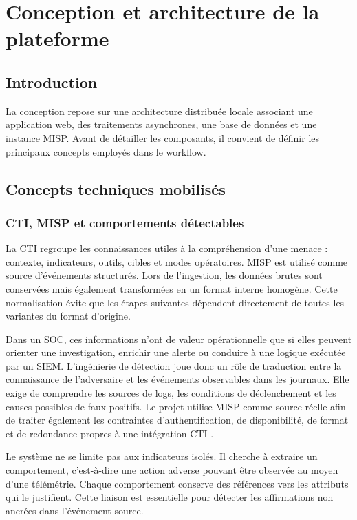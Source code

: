 \chapter{Conception et architecture de la plateforme}

\section{Introduction}

La conception repose sur une architecture distribuée locale associant une application web, des traitements asynchrones, une base de données et une instance MISP. Avant de détailler les composants, il convient de définir les principaux concepts employés dans le workflow.

\section{Concepts techniques mobilisés}

\subsection{CTI, MISP et comportements détectables}

La CTI regroupe les connaissances utiles à la compréhension d'une menace : contexte, indicateurs, outils, cibles et modes opératoires. MISP est utilisé comme source d'événements structurés. Lors de l'ingestion, les données brutes sont conservées mais également transformées en un format interne homogène. Cette normalisation évite que les étapes suivantes dépendent directement de toutes les variantes du format d'origine.

Dans un SOC, ces informations n'ont de valeur opérationnelle que si elles peuvent orienter une investigation, enrichir une alerte ou conduire à une logique exécutée par un SIEM. L'ingénierie de détection joue donc un rôle de traduction entre la connaissance de l'adversaire et les événements observables dans les journaux. Elle exige de comprendre les sources de logs, les conditions de déclenchement et les causes possibles de faux positifs. Le projet utilise MISP comme source réelle afin de traiter également les contraintes d'authentification, de disponibilité, de format et de redondance propres à une intégration CTI \cite{misp}.

Le système ne se limite pas aux indicateurs isolés. Il cherche à extraire un comportement, c'est-à-dire une action adverse pouvant être observée au moyen d'une télémétrie. Chaque comportement conserve des références vers les attributs qui le justifient. Cette liaison est essentielle pour détecter les affirmations non ancrées dans l'événement source.

